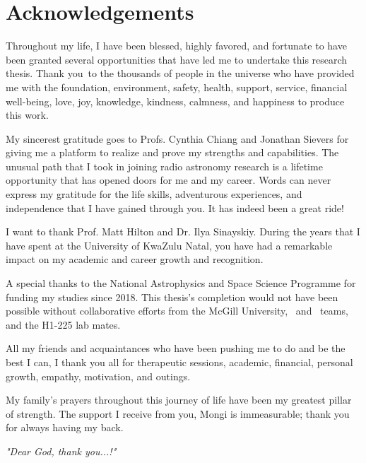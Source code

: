 \section*{Acknowledgements}

Throughout my life, I have been blessed, highly favored, and fortunate to have been granted several opportunities that have led me to undertake this research thesis. Thank you to the thousands of people in the universe who have provided me with the foundation, environment, safety, health, support, service, financial well-being, love, joy, knowledge, kindness, calmness, and happiness to produce this work.

My sincerest gratitude goes to Profs. Cynthia Chiang and Jonathan Sievers for giving me a platform to realize and prove my strengths and capabilities. The unusual path that I took in joining radio astronomy research is a lifetime opportunity that has opened doors for me and my career. Words can never express my gratitude for the life skills, adventurous experiences, and independence that I have gained through you. It has indeed been a great ride!

I want to thank Prof. Matt Hilton and Dr. Ilya Sinayskiy. During the years that I have spent at the University of KwaZulu Natal, you have had a remarkable impact on my academic and career growth and recognition. 

A special thanks to the National Astrophysics and Space Science Programme for funding my studies since 2018. This thesis's completion would not have been possible without collaborative efforts from the McGill University, \prizm\ and \albatros\ teams, and the H1-225 lab mates. 

All my friends and acquaintances who have been pushing me to do and be the best I can, I thank you all for therapeutic sessions, academic, financial, personal growth, empathy, motivation, and outings.

My family's prayers throughout this journey of life have been my greatest pillar of strength. The support I receive from you, Mongi is immeasurable; thank you for always having my back. \\[4 cm]


\begin{center}
	\emph{"Dear God, thank you...!"}
\end{center}
